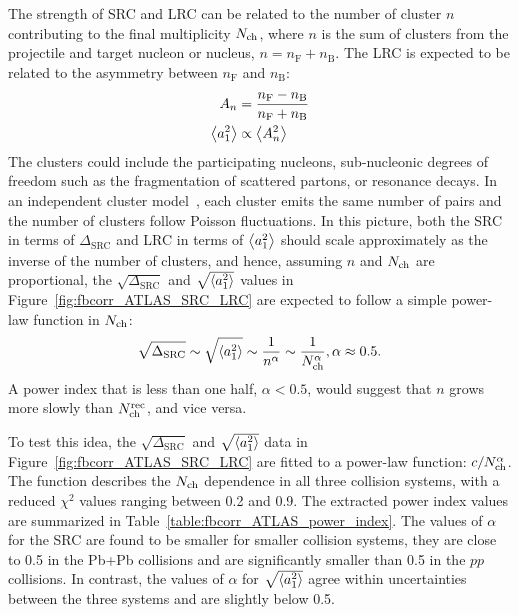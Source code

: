 The strength of SRC and LRC can be related to the number of cluster $n$ contributing to the final multiplicity $N_\text{ch}$, where $n$ is the sum of clusters from the projectile and target nucleon or nucleus, $n=n_\text{F} + n_\text{B}$. The LRC is expected to be related to the asymmetry between $n_\text{F}$ and $n_\text{B}$:
\begin{equation}
\begin{split}
A_n &= \frac{n_\text{F} - n_\text{B}}{n_\text{F} + n_\text{B}} \\
\left\langle a_1^2\right\rangle &\propto \left\langle A_n^2\right\rangle
\end{split}
\end{equation}
The clusters could include the participating nucleons, sub-nucleonic degrees of freedom such as the fragmentation of scattered partons, or resonance decays. In an independent cluster model~\cite{Berger:1974vn}, each cluster emits the same number of pairs and the number of clusters follow Poisson fluctuations. In this picture, both the SRC in terms of $\Delta_\text{SRC}$ and LRC in terms of $\left\langle a_1^2\right\rangle$ should scale approximately as the inverse of the number of clusters, and hence, assuming $n$ and $N_\text{ch}$ are proportional, the $\sqrt{\Delta_\text{SRC}}$ and $\sqrt{\left\langle a_1^2\right\rangle}$ values in Figure~\ref{fig:fbcorr_ATLAS_SRC_LRC} are expected to follow a simple power-law function in $N_\text{ch}$:
\begin{equation}
\sqrt{\Delta_\text{SRC}} \sim \sqrt{\left\langle a_1^2\right\rangle} \sim \frac{1}{n^\alpha} \sim \frac{1}{N_\text{ch}^\alpha}, \alpha \approx 0.5.
\end{equation}
A power index that is less than one half, $\alpha<0.5$, would suggest that $n$ grows more slowly than $N_\text{ch}^\text{rec}$, and vice versa.

To test this idea, the $\sqrt{\Delta_\text{SRC}}$ and $\sqrt{\left\langle a_1^2\right\rangle}$ data in Figure~\ref{fig:fbcorr_ATLAS_SRC_LRC} are fitted to a power-law function: $c / N_\text{ch}^\alpha$. The function describes the $N_\text{ch}$ dependence in all three collision systems, with a reduced $\chi^2$ values ranging between 0.2 and 0.9. The extracted power index values are summarized in Table~\ref{table:fbcorr_ATLAS_power_index}. The values of $\alpha$ for the SRC are found to be smaller for smaller collision systems, they are close to 0.5 in the Pb+Pb collisions and are significantly smaller than 0.5 in the $pp$ collisions. In contrast, the values of $\alpha$ for $\sqrt{\left\langle a_1^2\right\rangle}$ agree within uncertainties between the three systems and are slightly below 0.5.

